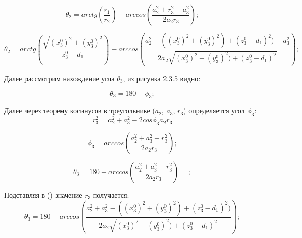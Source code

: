 \begin{enumerate}
\begin{equation}
    \theta_2=arctg(\frac{r_1}{r_2}) - arccos(\frac{a_2^2 + r_3^2 - a_3^2}{2 a_2 r_3});
\end{equation}

\begin{equation}
    \theta_2=arctg(\frac{\sqrt{(x_3^0)^2+(y_3^0)^2}}{z_3^0-d_1}) - arccos(\frac{a_2^2 + ((x_3^0)^2+(y_3^0)^2)+(z_3^0 - d_1)^2) - a_3^2}{2 a_2 \sqrt{(x_3^0)^2+(y_3^0)^2)+(z_3^0 - d_1)^2}});
\end{equation}

Далее рассмотрим нахождение угла $\theta_3$, из рисунка 2.3.5 видно:

\begin{equation}
    \theta_3=180-\phi_3;
\end{equation}

Далее через теорему косинусов в треугольнике ($a_2$, $a_3$, $r_3$) определяется угол $\phi_3$:\\
$$r_3^2=a_2^2+a_3^2 - 2cos\phi_3 a_2 r_3 $$

\begin{equation}
    \phi_3 = arccos(\frac{a_2^2 + a_3^2 -r_3^2}{2a_2 r_3});
\end{equation}

\begin{equation}
    \theta_3=180-arccos(\frac{a_2^2 + a_3^2 -r_3^2}{2a_2 r_3})=;
\end{equation}

Подставляя в () значение $r_3$ получается:\\

\begin{equation}
    \theta_3 = 180-arccos(\frac{a_2^2 + a_3^2 -((x_3^0)^2+(y_3^0)^2)+(z_3^0 - d_1)^2)}{2a_2 \sqrt{(x_3^0)^2+(y_3^0)^2)+(z_3^0 - d_1)^2}});
\end{equation}

 \end{enumerate}